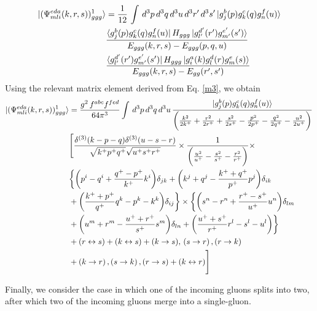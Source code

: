 \documentclass[a4paper,11pt]{article}
\begin{document}
\begin{figure}[htbp]
    \centering
\end{figure}
\begin{align}
    \ket{(\Psi^{eda}_{mli}(k,r,s))^{1}_{ggg}} & =  \frac{1}{12}\, \int\, d^{3}p\, d^{3}q\, d^{3}u\, d^{3}r^{\prime}\, d^{3}s^{\prime}\ket{g^{b}_{j}(p)g^{c}_{k}(q)g^{f}_{n}(u)}\notag \\ &   \frac{\bra{g^{b}_{j}(p)g^{c}_{k}(q)g^{f}_{n}(u)}H_{ggg}\ket{g^{d^{\prime}}_{l^{\prime}}(r^{\prime})g^{e^{\prime}}_{m^{\prime}}(s^{\prime})}}{E_{ggg}(k,r,s)-E_{ggg}(p,q,u)}\notag \\ & \frac{\bra{g^{d^{\prime}}_{l^{\prime}}(r^{\prime})g^{e^{\prime}}_{m^{\prime}}(s^{\prime})}H_{ggg}\ket{g^{a}_{i}(k)g^{d}_{l}(r)g^{e}_{m}(s)}}{E_{ggg}(k,r,s)-E_{gg}(r^{\prime},s^{\prime})}
\end{align}
Using the relevant matrix element derived from Eq. \eqref{m3}, we obtain
\begin{align}
     \ket{(\Psi^{eda}_{mli}(k,r,s))^{1}_{ggg}} & = \frac{g^{2}\,f^{abc}f^{fed}}{64\pi^{3}}\int\, d^{3}p\, d^{3}q \,d^{3}u\,\frac{\ket{g^{b}_{j}(p)g^{c}_{k}(q)g^{f}_{n}(u)}}{\bigg(\frac{k^{2}}{2k^{+}}+\frac{r^{2}}{2r^{+}}+\frac{s^{2}}{2s^{+}}-\frac{p^{2}}{2p^{+}}-\frac{q^{2}}{2q^{+}}-\frac{u^{2}}{2u^{+}}\bigg)}\,\notag \\ & \Bigg[\frac{\delta^{(3)}(k-p-q)\delta^{(3)}(u-s-r)}{\sqrt{k^{+}p^{+}q^{+}}\sqrt{u^{+}s^{+}r^{+}}}\times \frac{1}{\bigg(\frac{u^{2}}{u^{+}}-\frac{s^{2}}{s^{+}}-\frac{r^{2}}{r^{+}}\bigg)}\times\notag \\ &   \bigg\{\bigg(p^{i}-q^{i} +\frac{q^{+}-p^{+}}{k^{+}}k^{i}\bigg)\delta_{jk} +\bigg(k^{j}+q^{j}-\frac{k^{+}+q^{+}}{p^{+}}p^{j}\bigg)\delta_{ik}\notag \\ & +\bigg(\frac{k^{+}+p^{+}}{q^{+}}q^{k}-p^{k}-k^{k}\bigg)\delta_{ij}\bigg\} \times \bigg\{\bigg(s^{n}-r^{n}+\frac{r^{+}-s^{+}}{u^{+}}u^{n}\bigg)\delta_{lm}\notag \\ & +\bigg(u^{m}+r^{m}-\frac{u^{+}+r^{+}}{s^{+}}s^{m}\bigg)\delta_{ln} +\bigg(\frac{u^{+}+s^{+}}{r^{+}}r^{l}-s^{l}-u^{l}\bigg)\bigg\} \notag \\ & + (r\leftrightarrow s) + (k\leftrightarrow s)  + (k\rightarrow s),\,(s\rightarrow r)\,, (r\rightarrow k) \notag \\  &+ (k \rightarrow r)\, , (s\rightarrow k)\,, (r\rightarrow s)+(k\leftrightarrow r) \Bigg]
\end{align}

Finally, we consider the case in which one of the incoming gluons splits into two, after which two of the incoming gluons merge into a single-gluon.
\end{document}
